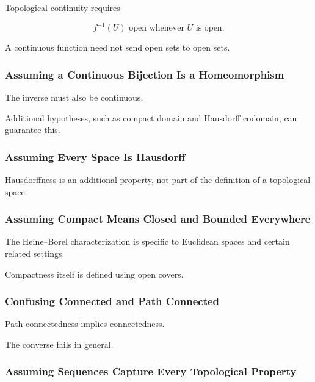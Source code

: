 Topological continuity requires

\[
\boxed{
f^{-1}(U)\text{ open whenever }U\text{ is open}.
}
\]

A continuous function need not send open sets to open sets.

\subsubsection{Assuming a Continuous Bijection Is a Homeomorphism}

The inverse must also be continuous.

Additional hypotheses, such as compact domain and Hausdorff codomain, can
guarantee this.

\subsubsection{Assuming Every Space Is Hausdorff}

Hausdorffness is an additional property, not part of the definition of a
topological space.

\subsubsection{Assuming Compact Means Closed and Bounded Everywhere}

The Heine--Borel characterization is specific to Euclidean spaces and
certain related settings.

Compactness itself is defined using open covers.

\subsubsection{Confusing Connected and Path Connected}

Path connectedness implies connectedness.

The converse fails in general.

\subsubsection{Assuming Sequences Capture Every Topological Property}


